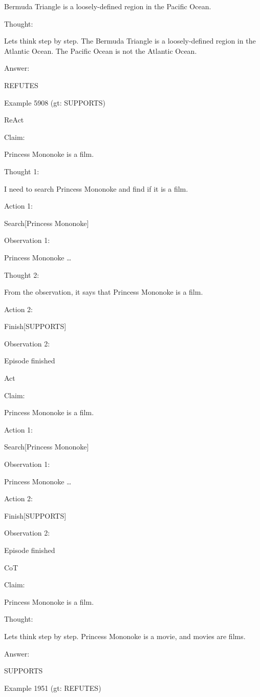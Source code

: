 \documentclass[
]{article}
\begin{document}
Bermuda Triangle is a loosely-defined region in the Pacific Ocean.

Thought:

Let\textquotesingle s think step by step. The Bermuda Triangle is a
loosely-defined region in the Atlantic Ocean. The Pacific Ocean is not
the Atlantic Ocean.

Answer:

REFUTES

Example 5908 (gt: SUPPORTS)

ReAct

Claim:

Princess Mononoke is a film.

Thought 1:

I need to search Princess Mononoke and find if it is a film.

Action 1:

Search{[}Princess Mononoke{]}

Observation 1:

Princess Mononoke \ldots{}

Thought 2:

From the observation, it says that Princess Mononoke is a film.

Action 2:

Finish{[}SUPPORTS{]}

Observation 2:

Episode finished

Act

Claim:

Princess Mononoke is a film.

Action 1:

Search{[}Princess Mononoke{]}

Observation 1:

Princess Mononoke \ldots{}

Action 2:

Finish{[}SUPPORTS{]}

Observation 2:

Episode finished

CoT

Claim:

Princess Mononoke is a film.

Thought:

Let\textquotesingle s think step by step. Princess Mononoke is a movie,
and movies are films.

Answer:

SUPPORTS

Example 1951 (gt: REFUTES)
\end{document}
